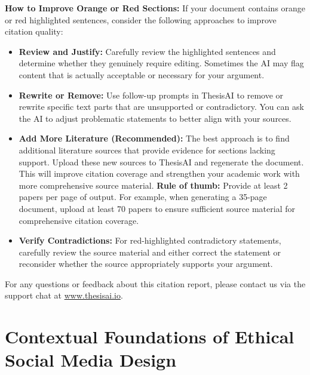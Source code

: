 \documentclass{article}
\begin{document}
\vspace{1em}

\noindent\textbf{How to Improve Orange or Red Sections:} If your document contains orange or red highlighted sentences, consider the following approaches to improve citation quality:

\begin{itemize}
 \item \textbf{Review and Justify:} Carefully review the highlighted sentences and determine whether they genuinely require editing. Sometimes the AI may flag content that is actually acceptable or necessary for your argument.

 \item \textbf{Rewrite or Remove:} Use follow-up prompts in ThesisAI to remove or rewrite specific text parts that are unsupported or contradictory. You can ask the AI to adjust problematic statements to better align with your sources.

 \item \textbf{Add More Literature (Recommended):} The best approach is to find additional literature sources that provide evidence for sections lacking support. Upload these new sources to ThesisAI and regenerate the document. This will improve citation coverage and strengthen your academic work with more comprehensive source material. \textbf{Rule of thumb:} Provide at least 2 papers per page of output. For example, when generating a 35-page document, upload at least 70 papers to ensure sufficient source material for comprehensive citation coverage.

 \item \textbf{Verify Contradictions:} For red-highlighted contradictory statements, carefully review the source material and either correct the statement or reconsider whether the source appropriately supports your argument.
\end{itemize}

\noindent For any questions or feedback about this citation report, please contact us via the support chat at \url{www.thesisai.io}.

\newpage

\tableofcontents

\newpage


\section{Contextual Foundations of Ethical Social Media Design}
\end{document}
